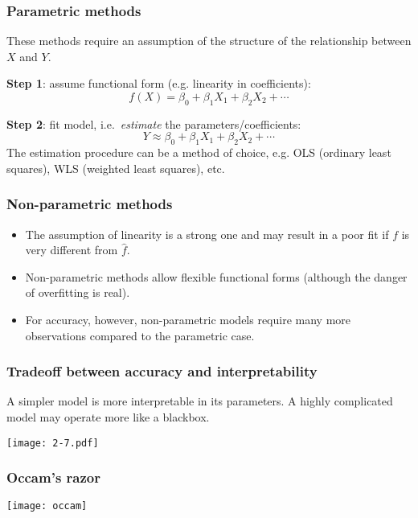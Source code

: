 \documentclass[usenames,dvipsnames,smaller]{beamer}
\newcommand{\?}{\stackrel{?}{=}}
\newcommand{\gr}{\color{green!40!black}}
\begin{document}
\begin{frame}
  \frametitle{Parametric methods}
  These methods require an assumption of the structure of the relationship between $X$ and $Y$.

  {\bf \gr Step 1}: assume functional form (e.g. linearity in coefficients):
  \begin{equation}
    \label{eq:1}
    f(X) = \beta_{0} + \beta_{1}X_1 + \beta_2X_2 + \cdots
  \end{equation}

  {\bf \gr Step 2}: fit model, i.e.\ \textit{estimate} the parameters/coefficients:
  \begin{equation}
    \label{eq:2}
    Y \approx  \beta_{0} + \beta_{1}X_1 + \beta_2X_2 + \cdots
  \end{equation}
  The estimation procedure can be a method of choice, e.g. OLS (ordinary least squares), WLS (weighted least squares), etc.
\end{frame}

\begin{frame}
  \frametitle{Non-parametric methods}
  \begin{itemize}
  \item The assumption of linearity is a  strong one and may result in a poor fit if $f$ is very different from $\hat f$.

  \item Non-parametric methods allow flexible functional forms (although the danger of overfitting is real).

  \item For accuracy, however, non-parametric models require many more observations compared to the parametric case.
\end{itemize}
  
\end{frame}

\begin{frame}
  \frametitle{Tradeoff between accuracy and interpretability}\pause

  A simpler model is more interpretable in its parameters. \pause  A highly complicated model may operate more like a blackbox.

  \begin{center}
    \texttt{[image: 2-7.pdf]}
  \end{center}

\end{frame}

\begin{frame}
  \frametitle{Occam's razor}
  \begin{center}
    \texttt{[image: occam]}
  \end{center}


\end{frame}
\end{document}
